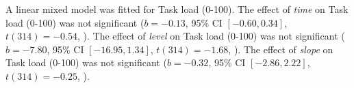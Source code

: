A linear mixed model was fitted for Task load (0-100).
The effect of \textit{time} on Task load (0-100) was not significant ($b = -0.13$, 95\% CI $[-0.60, 0.34]$, $t(314) = -0.54$, ).
The effect of \textit{level} on Task load (0-100) was not significant ($b = -7.80$, 95\% CI $[-16.95, 1.34]$, $t(314) = -1.68$, ).
The effect of \textit{slope} on Task load (0-100) was not significant ($b = -0.32$, 95\% CI $[-2.86, 2.22]$, $t(314) = -0.25$, ).
